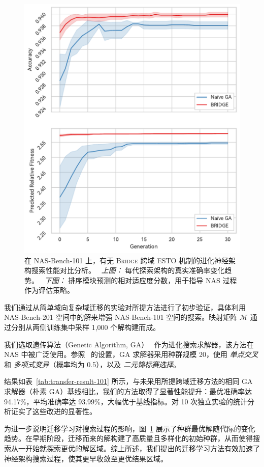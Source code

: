 \documentclass[../main.tex]{subfiles}
\begin{document}
\begin{figure}
	\centering
	\includegraphics[width=.67\linewidth]{BRIDGE/search-plot.pdf}
	\caption{在 NAS-Bench-101 上，有无 \textsc{Bridge} 跨域 ESTO 机制的进化神经架构搜索性能对比分析。
		\ \textit{上图：} 每代探索架构的真实准确率变化趋势。
		\ \textit{下图：} 排序模块预测的相对适应度分数，用于指导 NAS 过程作为评估策略。
	}\label{fig:search-process-plot}
\end{figure}

我们通过从简单域向复杂域迁移的实验对所提方法进行了初步验证，具体利用 NAS-Bench-201 空间中的解来增强 NAS-Bench-101 空间的搜索。映射矩阵 \( \mathcal{M} \) 通过分别从两侧训练集中采样 1,000 个解构建而成。

我们选取遗传算法（Genetic Algorithm, GA）~\cite{HollandGA1992} 作为进化搜索求解器，该方法在 NAS 中被广泛使用。参照~\cite{DBLP:conf/iconip/HouDFQ21} 的设置，GA 求解器采用种群规模 20，使用 \textit{单点交叉} 和 \textit{多项式变异}（概率均为 0.5），以及 \textit{二元锦标赛选择}。

结果如表~\ref{tab:transfer-result-101} 所示，与未采用所提跨域迁移方法的相同 GA 求解器（朴素 GA）基线相比，我们的方法取得了显著性能提升：最优准确率达 94.17\%，平均准确率达 93.99\%，大幅优于基线指标。对 10 次独立实验的统计分析证实了这些改进的显著性。

为进一步说明迁移学习对搜索过程的影响，图~\ref{fig:search-process-plot} 展示了种群最优解随代际的变化趋势。在早期阶段，迁移而来的解构建了高质量且多样化的初始种群，从而使得搜索从一开始就探索更优的解区域。综上所述，我们提出的迁移学习方法有效加速了神经架构搜索过程，使其更早收敛至更优结果区域。
\end{document}

